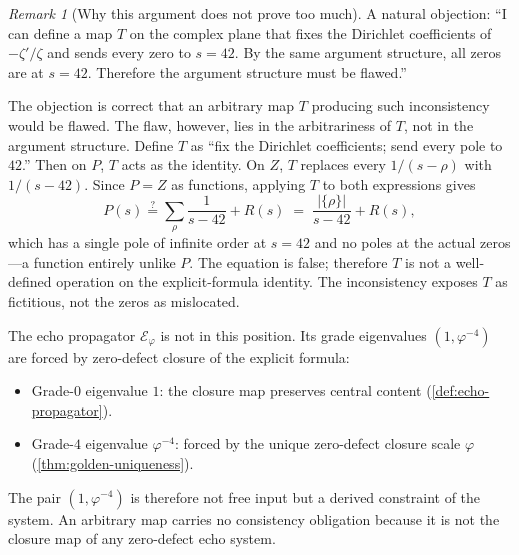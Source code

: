 \documentclass[11pt,a4paper]{article}
\theoremstyle{plain}
\theoremstyle{definition}
\theoremstyle{remark}
\newtheorem{remark}[theorem]{Remark}
\numberwithin{equation}{section}
\providecommand{\vp}{\varphi}
\providecommand{\EF}{\mathcal{E}}
\begin{document}
\begin{remark}[Why this argument does not prove too much]
\label{rmk:not-arbitrary-map}
A natural objection: ``I can define a map $T$ on the complex
plane that fixes the Dirichlet coefficients of $-\zeta'/\zeta$
and sends every zero to $s = 42$.  By the same argument
structure, all zeros are at $s = 42$.  Therefore the argument
structure must be flawed.''

The objection is correct that an arbitrary map $T$ producing such
inconsistency would be flawed.  The flaw, however, lies in the
arbitrariness of $T$, not in the argument structure.  Define
$T$ as ``fix the Dirichlet coefficients; send every pole to
$42$.''  Then on $P$, $T$ acts as the identity.  On $Z$, $T$
replaces every $1/(s - \rho)$ with $1/(s - 42)$.  Since $P = Z$
as functions, applying $T$ to both expressions gives
\[
  P(s) \stackrel{?}{=} \sum_\rho \frac{1}{s - 42} + R(s)
       \;=\; \frac{|\{\rho\}|}{s - 42} + R(s),
\]
which has a single pole of infinite order at $s = 42$ and no
poles at the actual zeros---a function entirely unlike $P$.  The
equation is false; therefore $T$ is not a well-defined operation
on the explicit-formula identity.  The inconsistency exposes $T$
as fictitious, not the zeros as mislocated.

The echo propagator $\EF_\vp$ is not in this position.  Its grade
eigenvalues $(1, \vp^{-4})$ are forced by zero-defect closure of
the explicit formula:
\begin{itemize}
  \item Grade-$0$ eigenvalue $1$: the closure map preserves
    central content (\cref{def:echo-propagator}).
  \item Grade-$4$ eigenvalue $\vp^{-4}$: forced by the unique
    zero-defect closure scale $\vp$ (\cref{thm:golden-uniqueness}).
\end{itemize}
The pair $(1, \vp^{-4})$ is therefore not free input but a
derived constraint of the system.  An arbitrary map carries no
consistency obligation because it is not the closure map of any
zero-defect echo system.
\end{remark}
\end{document}

